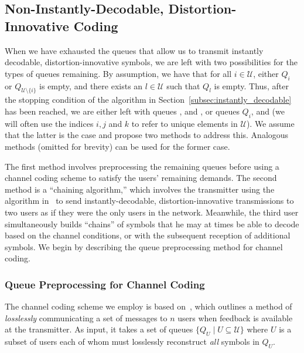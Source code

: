 \subsection{Non-Instantly-Decodable, Distortion-Innovative Coding}
\label{subsec:non_instant_coding}

When we have exhausted the queues that allow us to transmit instantly decodable, distortion-innovative symbols, we are left with two possibilities for the types of queues remaining.  By assumption, we have that for all $i \in \mathcal{U}$, either $Q_i$ or $Q_{\mathcal{U} \setminus \{i\}}$ is empty, and there exists an $l \in \mathcal{U}$ such that $Q_l$ is empty.  Thus, after the stopping condition of the algorithm in Section~\ref{subsec:instantly_decodable} has been reached, we are either left with queues ,  and , or queues $Q_i$,  and  (we will often use the indices $i, j$ and $k$ to refer to unique elements in $\mathcal{U}$).   We assume that the latter is the case and propose two methods to address this.  Analogous methods (omitted for brevity) can be used for the former case.

The first method involves preprocessing the remaining queues before using a channel coding scheme to satisfy the users' remaining demands.    The second method is a ``chaining algorithm,'' which involves the transmitter using the algorithm in~\cite{TMKS_TIT20} to send instantly-decodable, distortion-innovative transmissions to two users as if they were the only users in the network.  Meanwhile, the third user simultaneously builds ``chains'' of symbols that he may at times be able to decode based on the channel conditions, or with the subsequent reception of additional symbols.  We begin by describing the queue preprocessing method for channel coding.

\subsubsection{Queue Preprocessing for Channel Coding}
\label{subsec:channel_coding}

The channel coding scheme we employ is based on~\cite{GGT}, which outlines a method of \emph{losslessly} communicating a set of messages to $n$ users when feedback is available at the transmitter.  As input, it takes a set of queues $\{Q_U \mid U \subseteq \mathcal{U}\}$ where $U$ is a subset of users each of whom must losslessly reconstruct \emph{all} symbols in $Q_U$.

